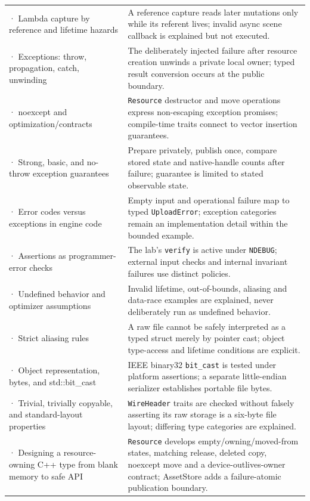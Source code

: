 {\begin{longtable}[]{@{}
  >{\raggedright\arraybackslash}p{}
  >{\raggedright\arraybackslash}p{}@{}}
190 · Lambda capture by reference and lifetime hazards & A reference capture reads later mutations only while its referent lives; invalid async scene callback is explained but not executed. \\
191 · Exceptions: throw, propagation, catch, unwinding & The deliberately injected failure after resource creation unwinds a private local owner; typed result conversion occurs at the public boundary. \\
192 · noexcept and optimization/contracts & \texttt{Resource} destructor and move operations express non-escaping exception promises; compile-time traits connect to vector insertion guarantees. \\
193 · Strong, basic, and no-throw exception guarantees & Prepare privately, publish once, compare stored state and native-handle counts after failure; guarantee is limited to stated observable state. \\
194 · Error codes versus exceptions in engine code & Empty input and operational failure map to typed \texttt{UploadError}; exception categories remain an implementation detail within the bounded example. \\
195 · Assertions as programmer-error checks & The lab's \texttt{verify} is active under \texttt{NDEBUG}; external input checks and internal invariant failures use distinct policies. \\
196 · Undefined behavior and optimizer assumptions & Invalid lifetime, out-of-bounds, aliasing and data-race examples are explained, never deliberately run as undefined behavior. \\
197 · Strict aliasing rules & A raw file cannot be safely interpreted as a typed struct merely by pointer cast; object type-access and lifetime conditions are explicit. \\
198 · Object representation, bytes, and std::bit\_cast & IEEE binary32 \texttt{bit\_cast} is tested under platform assertions; a separate little-endian serializer establishes portable file bytes. \\
199 · Trivial, trivially copyable, and standard-layout properties & \texttt{WireHeader} traits are checked without falsely asserting its raw storage is a six-byte file layout; differing type categories are explained. \\
200 · Designing a resource-owning C++ type from blank memory to safe API & \texttt{Resource} develops empty/owning/moved-from states, matching release, deleted copy, noexcept move and a device-outlives-owner contract; AssetStore adds a failure-atomic publication boundary. \\
\end{longtable}
}

